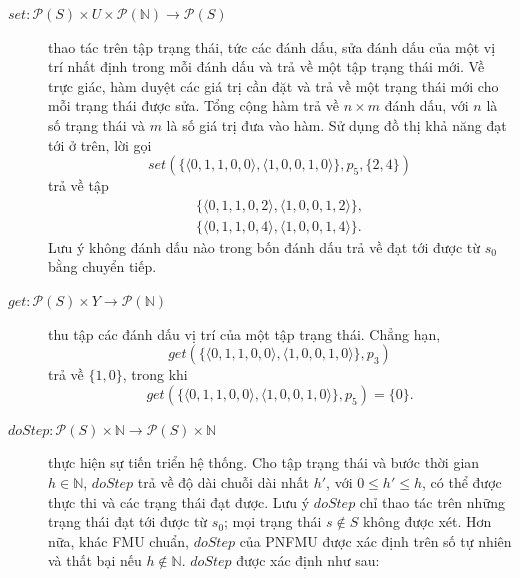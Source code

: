 \begin{description}
\item[$set:\mathcal{P}(S)\times U\times\mathcal{P}(\mathbb{N})\to\mathcal{P}(S)$]
thao tác trên tập trạng thái, tức các đánh dấu, sửa đánh dấu của một vị trí nhất định trong mỗi đánh dấu và trả về một tập trạng thái mới. Về trực giác, hàm duyệt các giá trị cần đặt và trả về một trạng thái mới cho mỗi trạng thái được sửa. Tổng cộng hàm trả về $n\times m$ đánh dấu, với $n$ là số trạng thái và $m$ là số giá trị đưa vào hàm. Sử dụng đồ thị khả năng đạt tới ở trên, lời gọi
\[
set(\{\langle0,1,1,0,0\rangle,\langle1,0,0,1,0\rangle\},p_5,\{2,4\})
\]
trả về tập
\[
\begin{gathered}
\{\langle0,1,1,0,2\rangle,\langle1,0,0,1,2\rangle\},\\
\{\langle0,1,1,0,4\rangle,\langle1,0,0,1,4\rangle\}.
\end{gathered}
\]
Lưu ý không đánh dấu nào trong bốn đánh dấu trả về đạt tới được từ $s_0$ bằng chuyển tiếp.
\item[$get:\mathcal{P}(S)\times Y\to\mathcal{P}(\mathbb{N})$]
thu tập các đánh dấu vị trí của một tập trạng thái. Chẳng hạn,
\[
get(\{\langle0,1,1,0,0\rangle,\langle1,0,0,1,0\rangle\},p_3)
\]
trả về $\{1,0\}$, trong khi
\[
get(\{\langle0,1,1,0,0\rangle,\langle1,0,0,1,0\rangle\},p_5)=\{0\}.
\]
\item[$doStep:\mathcal{P}(S)\times\mathbb{N}\to\mathcal{P}(S)\times\mathbb{N}$]
thực hiện sự tiến triển hệ thống. Cho tập trạng thái và bước thời gian $h\in\mathbb{N}$, $doStep$ trả về độ dài chuỗi dài nhất $h'$, với $0\leq h'\leq h$, có thể được thực thi và các trạng thái đạt được. Lưu ý $doStep$ chỉ thao tác trên những trạng thái đạt tới được từ $s_0$; mọi trạng thái $s\notin S$ không được xét. Hơn nữa, khác FMU chuẩn, $doStep$ của PNFMU được xác định trên số tự nhiên và thất bại nếu $h\notin\mathbb{N}$. $doStep$ được xác định như sau:
\end{description}

